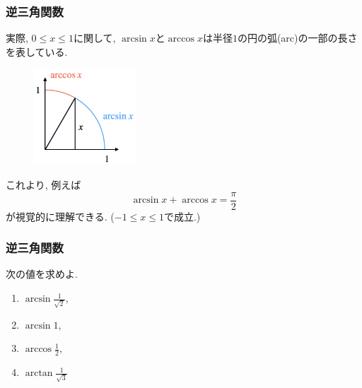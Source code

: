 \begin{frame}
\frametitle{逆三角関数}

実際, $0 \le x \le 1$に関して, $\arcsin x$と$\arccos x$は半径$1$の円の弧(arc)の一部の長さを表している. 

 \begin{figure}[htbp]
 \begin{center} 
  \includegraphics[width=38mm]{calculus6/arc2.png}
 \end{center}
\end{figure}
\vspace{-3mm}

これより, 例えば
$$
\arcsin x + \arccos x = \frac{\pi}{2}
$$
が視覚的に理解できる. ($-1\le x \le 1$で成立.)

\end{frame}




\begin{frame}
\frametitle{逆三角関数}



\begin{Prob}
次の値を求めよ. 
\begin{enumerate}
\item $\arcsin \frac{1}{\sqrt{2}}$,  %
\item $\arcsin 1$, %
\item $\arccos \frac{1}{2}$, %
\item $\arctan \frac{1}{\sqrt{3}}$ %
\end{enumerate}
\end{Prob}

\end{frame}





